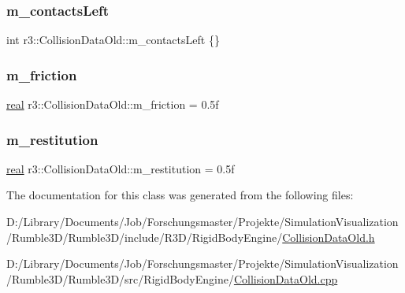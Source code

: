 \mbox{\label{classr3_1_1_collision_data_old_ad18fd7d0136d1e6d80c7c5340652a08d}} 
\subsubsection{\texorpdfstring{m\+\_\+contacts\+Left}{m\_contactsLeft}}
{\footnotesize\ttfamily int r3\+::\+Collision\+Data\+Old\+::m\+\_\+contacts\+Left \{\}\hspace{0.3cm}{\ttfamily [protected]}}

\mbox{\label{classr3_1_1_collision_data_old_a598bcf57a27bd4ed84eab8f64b334c12}} 
\subsubsection{\texorpdfstring{m\+\_\+friction}{m\_friction}}
{\footnotesize\ttfamily \mbox{\hyperlink{namespacer3_ab2016b3e3f743fb735afce242f0dc1eb}{real}} r3\+::\+Collision\+Data\+Old\+::m\+\_\+friction = 0.\+5f\hspace{0.3cm}{\ttfamily [protected]}}

\mbox{\label{classr3_1_1_collision_data_old_ae4fb8abfc80fdf2637e89bd2ef621aac}} 
\subsubsection{\texorpdfstring{m\+\_\+restitution}{m\_restitution}}
{\footnotesize\ttfamily \mbox{\hyperlink{namespacer3_ab2016b3e3f743fb735afce242f0dc1eb}{real}} r3\+::\+Collision\+Data\+Old\+::m\+\_\+restitution = 0.\+5f\hspace{0.3cm}{\ttfamily [protected]}}



The documentation for this class was generated from the following files\+:\begin{DoxyCompactItemize}
\item 
D\+:/\+Library/\+Documents/\+Job/\+Forschungsmaster/\+Projekte/\+Simulation\+Visualization/\+Rumble3\+D/\+Rumble3\+D/include/\+R3\+D/\+Rigid\+Body\+Engine/\mbox{\hyperlink{_collision_data_old_8h}{Collision\+Data\+Old.\+h}}\item 
D\+:/\+Library/\+Documents/\+Job/\+Forschungsmaster/\+Projekte/\+Simulation\+Visualization/\+Rumble3\+D/\+Rumble3\+D/src/\+Rigid\+Body\+Engine/\mbox{\hyperlink{_collision_data_old_8cpp}{Collision\+Data\+Old.\+cpp}}\end{DoxyCompactItemize}

